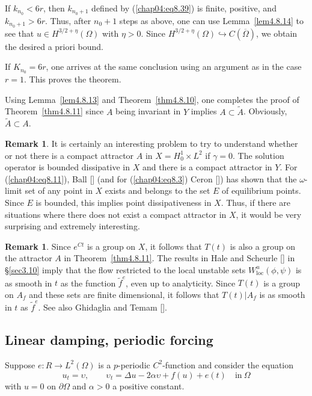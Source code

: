 \documentclass{surv-l}
\theoremstyle{plain}
\theoremstyle{definition}
\newtheorem{remark}[theorem]{Remark}
\numberwithin{equation}{section}
\numberwithin{figure}{chapter}
\begin{document}
If $k_{n_{0}}<6r$, then $k_{n_{0}+1}$ defined by (\ref{chap04:eq8.39}) is finite, positive, and $k_{n_{0}+1}>6r$. Thus, after $n_{0}+1$ steps as above, one can use Lemma~\ref{lem4.8.14} to see that $ u\in H^{3/2+\eta}(\Omega)$ with $\eta>0$. Since $H^{3/2+\eta}(\Omega)\hookrightarrow C(\overline{\Omega})$, we obtain the desired a priori bound.

If $K_{n_{0}}=6r$, one arrives at the same conclusion using an argument as in the case $r=1$. This proves the theorem.

Using Lemma~\ref{lem4.8.13} and Theorem~\ref{thm4.8.10}, one completes the proof of Theorem~\ref{thm4.8.11} since $A$ being invariant in $Y$ implies $A\subset\tilde{A}$. Obviously, $\tilde{A}\subset A$.

\begin{remark}\label{rem4.8.15}
It is certainly an interesting problem to try to understand whether or not there is a compact attractor $A$ in $X=H_{0}^{1}\times L^{2}$ if $\gamma=0$. The solution operator is bounded dissipative in $X$ and there is a compact attractor in $Y$. For (\ref{chap04:eq8.11}), Ball [\citeyear{1973ba}] (and for (\ref{chap04:eq8.3}) Ceron [\citeyear{1984c}]) has shown that the $\omega$-limit set of any point in $X$ exists and belongs to the set $E$ of equilibrium points. Since $E$ is bounded, this implies point dissipativeness in $X$. Thus, if there are situations where there does not exist a compact attractor in $X$, it would be very surprising and extremely interesting.
\end{remark}


\begin{remark}\label{rem4.8.16}
Since $e^{Ct}$ is a group on $X$, it follows that $T(t)$ is also a group on the attractor $A$ in Theorem~\ref{thm4.8.11}. The results in Hale and Scheurle [\citeyear{1985hs}] in \S \ref{sec3.10} imply that the flow restricted to the local unstable sets $W_{\mathrm{loc}}^{u}(\phi, \psi)$ is as smooth in $t$ as the function $\tilde{f}^{e}$, even up to analyticity. Since $T(t)$ is a group on $A_{f}$ and these sets are finite dimensional, it follows that $T(t)|A_{f}$ is as smooth in $t$ as $\tilde{f}^{e}$. See also Ghidaglia and Temam [\citeyear{1987gt}].
\end{remark}

\subsection{Linear damping, periodic forcing}\label{subsec4.8.4} Suppose $e:R\rightarrow L^{2}(\Omega)$ is a $p$-periodic $C^{2}$-function and consider the equation
\begin{equation}\label{chap04:eq8.40}
u_{t}=\upsilon,\qquad \upsilon_{t}=\Delta u-2\alpha\upsilon+f(u)+e(t)\quad \mathrm{in}\ \Omega
\end{equation}
with $u=0$ on $\partial\Omega$ and $\alpha>0$ a positive constant.
\end{document}
